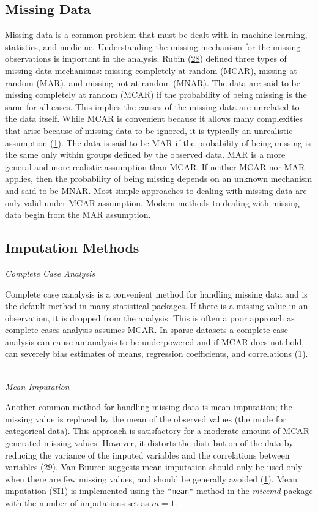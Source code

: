 \documentclass[12pt,]{article}
\begin{document}
\subsection{Missing Data}\label{missing-data}

Missing data is a common problem that must be dealt with in machine
learning, statistics, and medicine. Understanding the missing mechanism
for the missing observations is important in the analysis. Rubin
(\protect\hyperlink{ref-rubin_inference_1976}{28}) defined three types
of missing data mechanisms: missing completely at random (MCAR), missing
at random (MAR), and missing not at random (MNAR). The data are said to
be missing completely at random (MCAR) if the probability of being
missing is the same for all cases. This implies the causes of the
missing data are unrelated to the data itself. While MCAR is convenient
because it allows many complexities that arise because of missing data
to be ignored, it is typically an unrealistic assumption
(\protect\hyperlink{ref-van_buuren_flexible_2012}{1}). The data is said
to be MAR if the probability of being missing is the same only within
groups defined by the observed data. MAR is a more general and more
realistic assumption than MCAR. If neither MCAR nor MAR applies, then
the probability of being missing depends on an unknown mechanism and
said to be MNAR. Most simple approaches to dealing with missing data are
only valid under MCAR assumption. Modern methods to dealing with missing
data begin from the MAR assumption.

\subsection{Imputation Methods}\label{imputation-methods}

\emph{Complete Case Analysis}

Complete case canalysis is a convenient method for handling missing data
and is the default method in many statistical packages. If there is a
missing value in an observation, it is dropped from the analysis. This
is often a poor approach as complete cases analysis assumes MCAR. In
sparse datasets a complete case analysis can cause an analysis to be
underpowered and if MCAR does not hold, can severely bias estimates of
means, regression coefficients, and correlations
(\protect\hyperlink{ref-van_buuren_flexible_2012}{1}).

\(~\)\\
\emph{Mean Imputation}

Another common method for handling missing data is mean imputation; the
missing value is replaced by the mean of the observed values (the mode
for categorical data). This approach is satisfactory for a moderate
amount of MCAR-generated missing values. However, it distorts the
distribution of the data by reducing the variance of the imputed
variables and the correlations between variables
(\protect\hyperlink{ref-little_bayes_2014}{29}). Van Buuren suggests
mean imputation should only be used only when there are few missing
values, and should be generally avoided
(\protect\hyperlink{ref-van_buuren_flexible_2012}{1}). Mean imputation
(SI1) is implemented using the \texttt{"mean"} method in the
\emph{micemd} package with the number of imputations set as \(m=1\).
\end{document}
